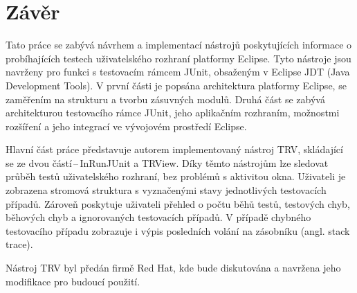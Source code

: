 \chapter{Závěr}                                                           %
Tato práce se zabývá návrhem a implementací nástrojů poskytujících informace o probíhajících testech uživatelského rozhraní platformy Eclipse. Tyto nástroje  jsou navrženy pro funkci s testovacím rámcem JUnit, obsaženým v Eclipse JDT (Java Development Tools). V první části je popsána architektura platformy Eclipse, se zaměřením na strukturu a tvorbu zásuvných modulů. Druhá část se zabývá architekturou testovacího rámce JUnit, jeho aplikačním rozhraním, možnostmi rozšíření a jeho integrací ve vývojovém prostředí Eclipse.

Hlavní část práce představuje autorem implementovaný nástroj TRV, skládající se ze dvou částí\,--\,InRunJUnit a TRView. Díky těmto nástrojům lze sledovat průběh testů uživatelského rozhraní, bez problémů s aktivitou okna. Uživateli je zobrazena stromová struktura s vyznačenými stavy jednotlivých testovacích případů. Zároveň poskytuje uživateli přehled o počtu běhů testů, testových chyb, běhových chyb a ignorovaných testovacích případů. V případě chybného testovacího případu zobrazuje i výpis posledních volání na zásobníku (angl. stack trace).

Nástroj TRV byl předán firmě Red Hat, kde bude diskutována a navržena jeho modifikace pro budoucí použití. 
